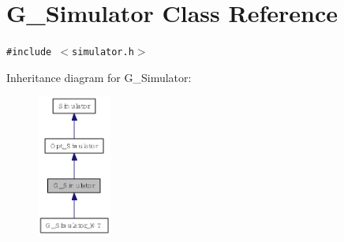 \hypertarget{class_g___simulator}{
\section{G\_\-Simulator Class Reference}
\label{class_g___simulator}
}
{\tt \#include $<$simulator.h$>$}

Inheritance diagram for G\_\-Simulator:\nopagebreak
\begin{figure}[H]
\begin{center}
\leavevmode
\includegraphics[width=69pt]{class_g___simulator__inherit__graph}
\end{center}
\end{figure}
